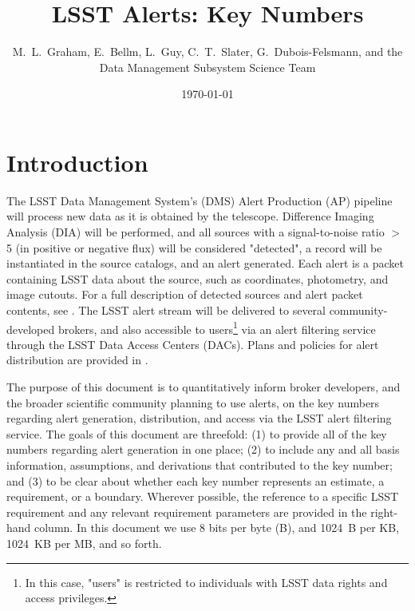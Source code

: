 \documentclass[DM,lsstdraft,authoryear,toc]{lsstdoc}
\title[Alerts Key Numbers]{LSST Alerts: Key Numbers}
\author{%
M.~L.~Graham, E.~Bellm, L.~Guy, C.~T.~Slater, G.~Dubois-Felsmann, and the Data Management Subsystem Science Team
}
\date{\today}
\begin{document}
\maketitle

\section{Introduction} \label{sec:intro}

The LSST Data Management System's (DMS) Alert Production (AP) pipeline will process new data as it is obtained by the telescope. 
Difference Imaging Analysis (DIA) will be performed, and all sources with a signal-to-noise ratio $>$5 (in positive or negative flux) will be considered "detected", a record will be instantiated in the source catalogs, and an alert generated.
Each alert is a packet containing LSST data about the source, such as coordinates, photometry, and image cutouts. 
For a full description of detected sources and alert packet contents, see . 
The LSST alert stream will be delivered to several community-developed brokers, and also accessible to users\footnote{In this case, "users" is restricted to individuals with LSST data rights and access privileges.} via an alert filtering service through the LSST Data Access Centers (DACs). 
Plans and policies for alert distribution are provided in . 

The purpose of this document is to quantitatively inform broker developers, and the broader scientific community planning to use alerts, on the key numbers regarding alert generation, distribution, and access via the LSST alert filtering service. 
The goals of this document are threefold: (1) to provide all of the key numbers regarding alert generation in one place; (2) to include any and all basis information, assumptions, and derivations that contributed to the key number; and (3) to be clear about whether each key number represents an estimate, a requirement, or a boundary. 
Wherever possible, the reference to a specific LSST requirement and any relevant requirement parameters are provided in the right-hand column. 
In this document we use 8 bits per byte (B), and 1024~B per KB, 1024~KB per MB, and so forth.
\end{document}
